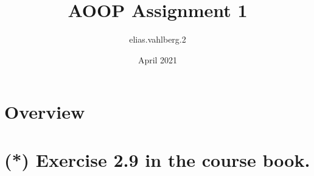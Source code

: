 \documentclass{article}
\title{AOOP Assignment 1 }
\author{elias.vahlberg.2 }
\date{April 2021}
\begin{document}
\maketitle

\section*{Overview}
\section{(*) Exercise 2.9 in the course book.}
\end{document}
